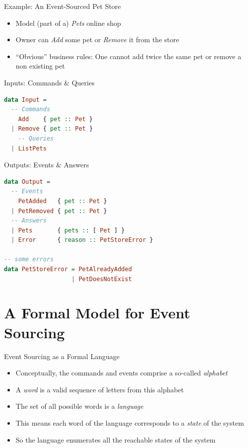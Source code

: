 \begin{frame}[fragile]{Example: An Event-Sourced Pet Store}
  \begin{itemize}[<+->]
  \item Model (part of a) \emph{Pets} online shop
  \item Owner can \emph{Add} some pet or \emph{Remove} it from the store
  \item ``Obvious'' business rules: One cannot add twice the same pet or remove a non existing pet
  \end{itemize}
\end{frame}

\begin{frame}[fragile]{Inputs: Commands \& Queries}
  \begin{lstlisting}[language=Haskell,basicstyle=\ttfamily,keywordstyle=\color{red}]
data Input =
  -- Commands
    Add    { pet :: Pet }
  | Remove { pet :: Pet }
    -- Queries
  | ListPets
\end{lstlisting}
\end{frame}

\begin{frame}[fragile]{Outputs: Events \& Answers}
\begin{lstlisting}[language=Haskell,basicstyle=\ttfamily,keywordstyle=\color{red}]
data Output =
  -- Events
    PetAdded   { pet :: Pet }
  | PetRemoved { pet :: Pet }
  -- Answers
  | Pets       { pets :: [ Pet ] }
  | Error      { reason :: PetStoreError }

-- some errors
data PetStoreError = PetAlreadyAdded
                   | PetDoesNotExist
\end{lstlisting}
\end{frame}

\part{A Formal Model for Event Sourcing}

\begin{frame}[fragile]{Event Sourcing as a Formal Language}

\begin{itemize}[<+->]
\item Conceptually, the commands and events comprise a so-called \textit{alphabet}
\item A \textit{word} is a valid sequence of letters from this alphabet
\item The set of all possible words is a \textit{language}
\item This means each word of the language corresponds to a \textit{state} of the system
\item So the language enumerates all the reachable states of the system
\end{itemize}

\end{frame}

